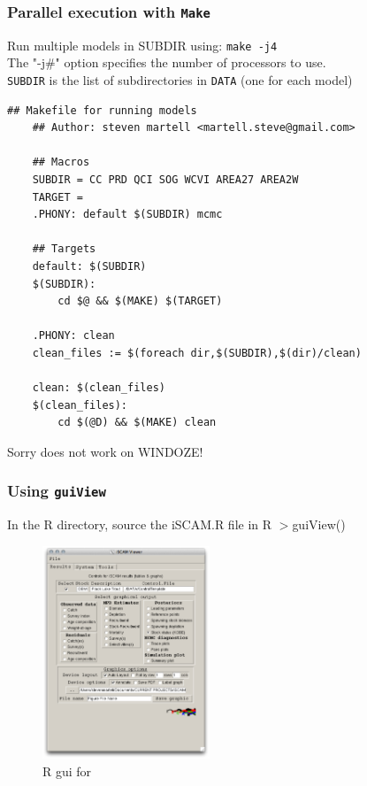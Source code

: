\begin{frame}[fragile,shrink=30]
	\frametitle{Parallel execution with \texttt{Make}}
	Run multiple models in SUBDIR using: \texttt{make -j4}\\
	The "-j#" option specifies the number of processors to use.\\
	\texttt{SUBDIR} is the list of subdirectories in \texttt{DATA} (one for each model)\\
	\begin{lstlisting}[frame=single]
	## Makefile for running models
	## Author: steven martell <martell.steve@gmail.com>

	## Macros
	SUBDIR = CC PRD QCI SOG WCVI AREA27 AREA2W
	TARGET = 
	.PHONY: default $(SUBDIR) mcmc
	
	## Targets
	default: $(SUBDIR)
	$(SUBDIR):
		cd $@ && $(MAKE) $(TARGET)

	.PHONY: clean
	clean_files := $(foreach dir,$(SUBDIR),$(dir)/clean)

	clean: $(clean_files)
	$(clean_files):
		cd $(@D) && $(MAKE) clean
	\end{lstlisting}
	Sorry does not work on WINDOZE!
\end{frame}



\begin{frame}
	\frametitle{Using \texttt{guiView}}
	In the R directory, source the iSCAM.R file in R $>$guiView()
	\begin{figure}[htbp]
		\centering
			\includegraphics[height=2.5in]{screenCaptures/guiView.pdf}
		\caption{R gui for \iscam}
		\label{fig:screenCaptures_guiView}
	\end{figure}
	
\end{frame}


